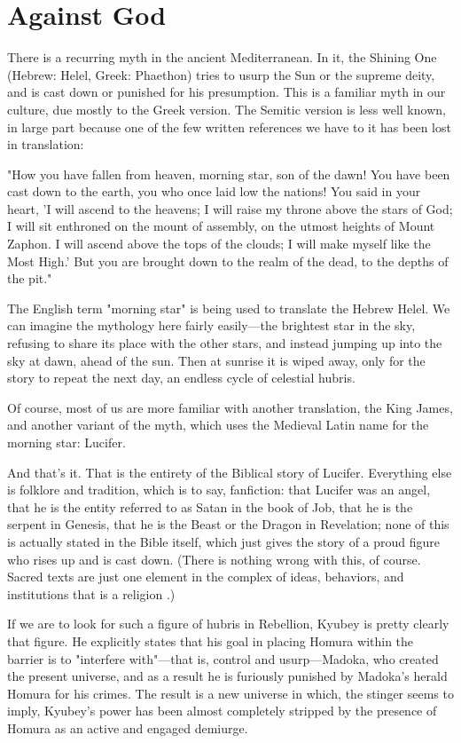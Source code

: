\chapter{Against God}
There is a recurring myth in the ancient Mediterranean. In it, the Shining One (Hebrew: Helel, Greek: Phaethon) tries to usurp the Sun or the supreme deity, and is cast down or punished for his presumption. This is a familiar myth in our culture, due mostly to the Greek version. The Semitic version is less well known, in large part because one of the few written references we have to it has been lost in translation: 

"How you have fallen from heaven, morning star, son of the dawn! You have been cast down to the earth, you who once laid low the nations! You said in your heart, 'I will ascend to the heavens; I will raise my throne above the stars of God; I will sit enthroned on the mount of assembly, on the utmost heights of Mount Zaphon. I will ascend above the tops of the clouds; I will make myself like the Most High.' But you are brought down to the realm of the dead, to the depths of the pit." \cite{ref122}

The English term "morning star" is being used to translate the Hebrew Helel. We can imagine the mythology here fairly easily—the brightest star in the sky, refusing to share its place with the other stars, and instead jumping up into the sky at dawn, ahead of the sun. Then at sunrise it is wiped away, only for the story to repeat the next day, an endless cycle of celestial hubris.

Of course, most of us are more familiar with another translation, the King James, and another variant of the myth, which uses the Medieval Latin name for the morning star: Lucifer.

And that's it. That is the entirety of the Biblical story of Lucifer. Everything else is folklore and tradition, which is to say, fanfiction: that Lucifer was an angel, that he is the entity referred to as Satan in the book of Job, that he is the serpent in Genesis, that he is the Beast or the Dragon in Revelation; none of this is actually stated in the Bible itself, which just gives the story of a proud figure who rises up and is cast down. (There is nothing wrong with this, of course. Sacred texts are just one element in the complex of ideas, behaviors, and institutions that is a religion \cite{ref123}.) 

If we are to look for such a figure of hubris in Rebellion, Kyubey is pretty clearly that figure. He explicitly states that his goal in placing Homura within the barrier is to "interfere with"—that is, control and usurp—Madoka, who created the present universe, and as a result he is furiously punished by Madoka's herald Homura for his crimes. The result is a new universe in which, the stinger seems to imply, Kyubey's power has been almost completely stripped by the presence of Homura as an active and engaged demiurge.

